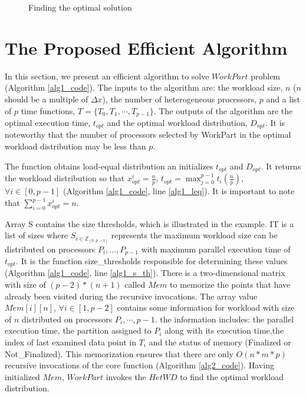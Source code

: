 \documentclass[12pt]{article}
\begin{document}
\begin{figure}[!t]
	\centering
	\caption{Finding the optimal solution}
	\label{ex_fig8}
\end{figure}

\section{The Proposed Efficient Algorithm}
In this section, we present an efficient algorithm to solve $WorkPart$ problem (Algorithm \ref{alg1_code}). The inputs to the algorithm are: the workload size, $n$ ($n$ should be a multiple of $\Delta x$), the number of heterogeneous processors, $p$ and a list of $p$ time functions, $T=\{T_0,T_1,\cdots,T_{p-1}\}$. The outputs of the algorithm are the optimal execution time, $t_{opt}$ and the optimal workload distribution, $D_{opt}$. It is noteworthy that the number of processors selected by WorkPart in the optimal workload distribution may be less than $p$.

The function obtains load-equal distribution an initializes $t_{opt}$ and $D_{opt}$. It returns the workload distribution so that $x_{opt}^i=\frac{n}{p}$, $t_{opt}=\max_{j=0}^{p-1} t_i(\frac{n}{p})$, $\forall i \in [0,p-1]$ (Algorithm \ref{alg1_code}, line \ref{alg1_leq}). It is important to note that $\sum_{i=0}^{p-1} x_{opt}^i = n$. 

Array S contains the size thresholds, which is illustrated in the example. IT is a list of sizes where $S_{i \in \mathbb{Z}_{[0..p - 1]}}$ represents the maximum workload size can be distributed on processors $P_i,...,P_{p - 1}$ with maximum parallel execution time of $t_{opt}$. It is the function size\_thresholds responsible for determining these values (Algorithm \ref{alg1_code}, line \ref{alg1_s_th}). There is a two-dimensional matrix with size of $(p-2)*(n+1)$ called $Mem$ to memorize the points that have already been visited during the recursive invocations. The array value $Mem[i][n]$, $\forall i \in [1,p-2]$ contains some information for workload with size of $n$ distributed on processors $P_i,\cdots,p-1$. the information includes: the parallel execution time, the partition assigned to $P_i$ along with its execution time,the index of last examined data point in $T_i$ and the status of memory (Finalized or Not\_Finalized). This memorization ensures that there are only $O(n*m*p)$ recursive invocations of the core function (Algorithm \ref{alg2_code}). Having initialized $Mem$, $WorkPart$ invokes the $HetWD$ to find the optimal workload distribution.
\end{document}
